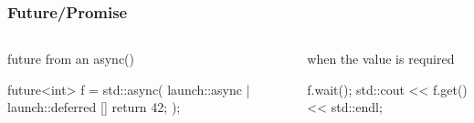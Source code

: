 \documentclass[UTF8,lualatex]{ctexbeamer}
\begin{document}
\begin{frame}[fragile]
    \frametitle{Future/Promise}
    \scriptsize
    \begin{columns}[t]
        \begin{column}{.5\textwidth}
            \begin{exampleblock}{future from an async()}
                \begin{cppcode}
                    future<int> f = std::async(
                        launch::async | launch::deferred
                        []{ return 42; });
                \end{cppcode}
            \end{exampleblock}
        \end{column}
        \begin{column}{.5\textwidth}
            \begin{block}{when the value is required}
                \begin{cppcode}
                    f.wait();
                    std::cout << f.get() << std::endl;
                \end{cppcode}
            \end{block}
        \end{column}
    \end{columns}
\end{frame}

\end{document}

